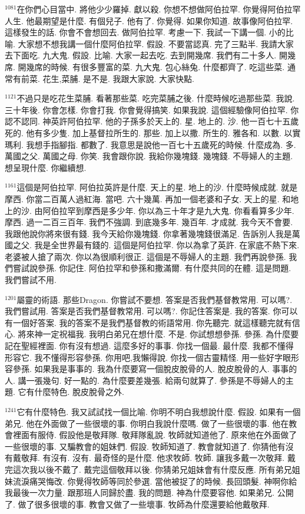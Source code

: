 \documentclass{book}
\begin{document}
$^{1081}$在你們心目當中.
將他少少羅掉.
獻以殺.
你想不想做阿伯拉罕.
你覺得阿伯拉罕人生.
他最期望是什麼.
有個兒子.
他有了.
你覺得.
如果你知道.
故事像阿伯拉罕.
這樣發生的話.
你會不會想回去.
做阿伯拉罕.
考慮一下.
我試一下講一個.
小的比喻.
大家想不想我講一個什麼阿伯拉罕.
假設.
不要當認真.
完了三點半.
我請大家去下面吃.
九大鬼.
假設.
比喻.
大家一起去吃.
去到開幾席.
我們有二十多人.
開幾席.
開幾席的時候.
有很多豐富的菜.
九大鬼.
包心絲兔.
什麼都齊了.
吃這些菜.
通常有前菜.
花生,菜脯.
是不是.
我跟大家說.
大家快點.

$^{1121}$不過只是吃花生菜脯.
看著那些菜.
吃完菜脯之後.
什麼時候吃過那些菜.
我說.
三十年後.
你會怎樣.
你會打我.
你會覺得搞笑.
如果我說.
這個經驗像阿伯拉罕.
你認不認同.
神英許阿伯拉罕.
他的子孫多於天上的.
星.
地上的.
沙.
他一百七十五歲死的.
他有多少隻.
加上基督拉所生的.
那些.
加上以撒.
所生的.
雅各和.
以數.
以實瑪利.
我想手指腳指.
都數了.
我意思是說他一百七十五歲死的時候.
什麼成為.
多.
萬國之父.
萬國之母.
你笑.
我會跟你說.
我給你幾塊錢.
幾塊錢.
不辱婦人的主題.
想呈現什麼.
你繼續想.

$^{1161}$這個是阿伯拉罕.
阿伯拉英許是什麼.
天上的星.
地上的沙.
什麼時候成就.
就是摩西.
你當二百萬人過紅海.
當吧.
六十幾萬.
再加一個老婆和子女.
天上的星.
和地上的沙.
由阿伯拉罕到摩西是多少年.
你以為三十年才是九大鬼.
你看看算多少年.
摩西.
過一二百三百年.
我們不強調.
到底幾多年.
幾百年.
才成就.
我今天不會要.
我跟他說你將來很有錢.
我今天給你幾塊錢.
你拿著幾塊錢很滿足.
告訴別人我是萬國之父.
我是全世界最有錢的.
這個是阿伯拉罕.
你以為拿了英許.
在家底不熱下來.
老婆被人搶了兩次.
你以為很順利很正.
這個是不辱婦人的主題.
我們再說參孫.
我們嘗試說參孫.
你記住.
阿伯拉罕和參孫和撒滿爾.
有什麼共同的在體.
這是問題.
我們嘗試不用.

$^{1201}$屬靈的術語.
那些Dragon.
你嘗試不要想.
答案是否我們基督教常用.
可以嗎?.
我們嘗試用.
答案是否我們基督教常用.
可以嗎?.
你記住答案是.
我的答案.
你可以有一個好答案.
我的答案不是我們基督教的術語常用.
你先聽完.
就這樣聽完就有信心.
將來神一定祝福我.
我明白弟兄在想什麼.
不是.
你試想想參孫.
參孫.
為什麼要記在聖經裡面.
你有沒有想過.
這麼多好的事事.
你找一個最.
最什麼.
我都不懂得形容它.
我不懂得形容參孫.
你用吧,我懶得說.
你找一個古靈精怪.
用一些好字眼形容參孫.
如果我是事事的.
我為什麼要寫一個脫皮脫骨的人.
脫皮脫骨的人.
事事的人.
講一張幾句.
好一點的.
為什麼要差幾張.
給兩句就算了.
參孫是不辱婦人的主題.
它有什麼特色.
脫皮脫骨之外.

$^{1241}$它有什麼特色.
我又試試找一個比喻.
你明不明白我想說什麼.
假設.
如果有一個弟兄.
他在外面做了一些很壞的事.
你明白我說什麼嗎.
做了一些很壞的事.
他在教會裡面有服侍.
假設他是敬拜隊.
敬拜隊亂說.
牧師就知道他了.
原來他在外面做了一些很壞的事.
又騙教會的姐妹們.
假設.
牧師知道了.
教會就知道了.
你猜他有沒有戴敬拜.
有沒有.
沒有.
最奇怪的是什麼.
他求牧師.
牧師.
讓我多戴一次敬拜.
戴完這次我以後不戴了.
戴完這個敬拜以後.
你猜弟兄姐妹會有什麼反應.
所有弟兄姐妹流淚痛哭悔改.
你覺得牧師等同於參選.
當他被捉了的時候.
長回頭髮.
神啊你給我最後一次力量.
跟那班人同歸於盡.
我的問題.
神為什麼要容他.
如果弟兄.
公開了.
做了很多很壞的事.
教會又做了一些壞事.
牧師為什麼還要給他戴敬拜.
\end{document}
